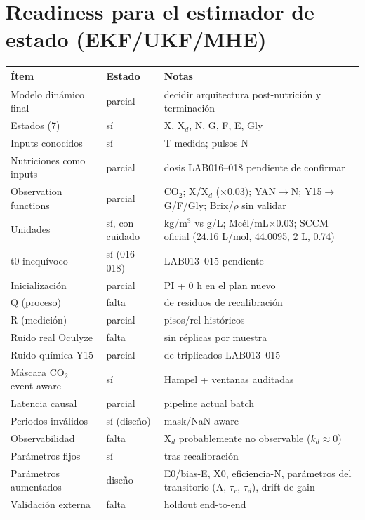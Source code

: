 \documentclass[11pt,a4paper]{article}
\begin{document}
\section{Readiness para el estimador de estado (EKF/UKF/MHE)}

\begin{longtable}{P{3.8cm}P{1.6cm}P{8.4cm}}
\toprule
\'Item & Estado & Notas \\
\midrule
Modelo din\'amico final & parcial & decidir arquitectura post-nutrici\'on y terminaci\'on \\
Estados (7) & s\'i & X, X$_d$, N, G, F, E, Gly \\
Inputs conocidos & s\'i & T medida; pulsos N \\
Nutriciones como inputs & parcial & dosis LAB016--018 pendiente de confirmar \\
Observation functions & parcial & CO$_2$; X/X$_d$ ($\times$0.03); YAN$\to$N; Y15$\to$G/F/Gly; Brix/$\rho$ sin validar \\
Unidades & s\'i, con cuidado & kg/m$^3$ vs g/L; Mc\'el/mL$\times$0.03; SCCM oficial (24.16 L/mol, 44.0095, 2 L, 0.74) \\
t0 inequ\'ivoco & s\'i (016--018) & LAB013--015 pendiente \\
Inicializaci\'on & parcial & PI + 0 h en el plan nuevo \\
Q (proceso) & falta & de residuos de recalibraci\'on \\
R (medici\'on) & parcial & pisos/rel hist\'oricos \\
Ruido real Oculyze & falta & sin r\'eplicas por muestra \\
Ruido qu\'imica Y15 & parcial & de triplicados LAB013--015 \\
M\'ascara CO$_2$ event-aware & s\'i & Hampel + ventanas auditadas \\
Latencia causal & parcial & pipeline actual batch \\
Periodos inv\'alidos & s\'i (dise\~no) & mask/NaN-aware \\
Observabilidad & falta & X$_d$ probablemente no observable ($k_d\approx 0$) \\
Par\'ametros fijos & s\'i & tras recalibraci\'on \\
Par\'ametros aumentados & dise\~no & E0/bias-E, X0, eficiencia-N, par\'ametros del transitorio (A, $\tau_r$, $\tau_d$), drift de gain \\
Validaci\'on externa & falta & holdout end-to-end \\
\bottomrule
\end{longtable}
\end{document}

